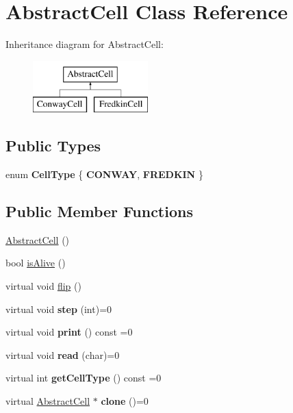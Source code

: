 \hypertarget{classAbstractCell}{\section{Abstract\-Cell Class Reference}
\label{classAbstractCell}
}
Inheritance diagram for Abstract\-Cell\-:\begin{figure}[H]
\begin{center}
\leavevmode
\includegraphics[height=2.000000cm]{classAbstractCell}
\end{center}
\end{figure}
\subsection*{Public Types}
\begin{DoxyCompactItemize}
\item 
enum {\bfseries Cell\-Type} \{ {\bfseries C\-O\-N\-W\-A\-Y}, 
{\bfseries F\-R\-E\-D\-K\-I\-N}
 \}
\end{DoxyCompactItemize}
\subsection*{Public Member Functions}
\begin{DoxyCompactItemize}
\item 
\hyperlink{classAbstractCell_acb4a116b1a007c03ce4e3644e6815a12}{Abstract\-Cell} ()
\item 
bool \hyperlink{classAbstractCell_a745364f521c5f2166387c36948f1d225}{is\-Alive} ()
\item 
virtual void \hyperlink{classAbstractCell_a2adb986c55c4ed6613549ff011fb8d25}{flip} ()
\item 
\hypertarget{classAbstractCell_a7902ac8171634af98039871fcd6ef8f8}{virtual void {\bfseries step} (int)=0}\label{classAbstractCell_a7902ac8171634af98039871fcd6ef8f8}

\item 
\hypertarget{classAbstractCell_abbc8049ebc500651020b0a9deb32726a}{virtual void {\bfseries print} () const =0}\label{classAbstractCell_abbc8049ebc500651020b0a9deb32726a}

\item 
\hypertarget{classAbstractCell_af28a8dcd6a7ac989c1fb85b06e254c90}{virtual void {\bfseries read} (char)=0}\label{classAbstractCell_af28a8dcd6a7ac989c1fb85b06e254c90}

\item 
\hypertarget{classAbstractCell_aa43ebbf6e33388ef444089328d6e3d99}{virtual int {\bfseries get\-Cell\-Type} () const =0}\label{classAbstractCell_aa43ebbf6e33388ef444089328d6e3d99}

\item 
\hypertarget{classAbstractCell_a6fd8f93b5a1547280fec2cb74241af38}{virtual \hyperlink{classAbstractCell}{Abstract\-Cell} $\ast$ {\bfseries clone} ()=0}\label{classAbstractCell_a6fd8f93b5a1547280fec2cb74241af38}

\end{DoxyCompactItemize}
